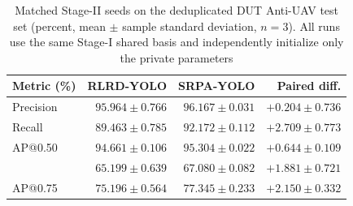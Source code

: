 \begin{table}[H]
\caption{Matched Stage-II seeds on the deduplicated DUT Anti-UAV test set (percent, mean $\pm$ sample standard deviation, $n=3$). All runs use the same Stage-I shared basis and independently initialize only the private parameters\label{tab:seeds}}
\centering\srpatablesetup
\begin{tabular}{@{}lrrr@{}}
\toprule
Metric (\%) & RLRD-YOLO & SRPA-YOLO & Paired diff.\\
\midrule
Precision & $95.964\pm0.766$ & $\mathbf{96.167\pm0.031}$ & $+0.204\pm0.736$\\
Recall & $89.463\pm0.785$ & $\mathbf{92.172\pm0.112}$ & $+2.709\pm0.773$\\
AP@0.50 & $94.661\pm0.106$ & $\mathbf{95.304\pm0.022}$ & $+0.644\pm0.109$\\
\mapall{} & $65.199\pm0.639$ & $\mathbf{67.080\pm0.082}$ & $+1.881\pm0.721$\\
AP@0.75 & $75.196\pm0.564$ & $\mathbf{77.345\pm0.233}$ & $+2.150\pm0.332$\\
\bottomrule
\end{tabular}
\end{table}
\vspace{-4pt}

